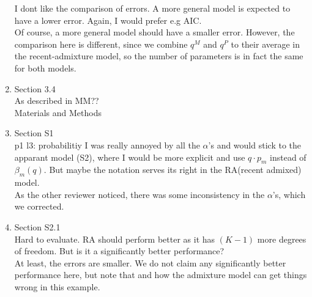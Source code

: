 \documentclass[12pt]{article}
\theoremstyle{definition}
\begin{document}
\begin{enumerate}
  I dont like the comparison of errors. A more general model is expected to have a lower error. Again, I would prefer e.g AIC.
  \\
  {\color{blue} Of course, a more general model should have a smaller error. However, the comparison here is different, since we combine $q^M$ and $q^P$ to their average in the recent-admixture model, so the number of parameters is in fact the same for both models. }
\item   
  Section 3.4\\
  As described in MM??
  \\ {\color{blue} Materials and Methods}
\item Section S1\\
  p1 l3: probabilitiy I was really annoyed by all the $\alpha$’s and would stick to the apparant model (S2), where I would be more
  explicit and use $q\cdot p_m$ instead of $\beta_m(q)$. But maybe the
  notation serves its right in the RA(recent admixed) model.
  \\ {\color{blue}As the other reviewer noticed, there was some inconsistency in the $\alpha$'s, which we corrected. }
  \item 
  Section S2.1\\
  Hard to evaluate. RA should perform better as it has $(K-1)$ more degrees of freedom. But is it a significantly better performance?
  \\ {\color{blue} At least, the errors are smaller. We do not claim any significantly better performance here, but note that and how the admixture model can get things wrong in this example.}
\end{enumerate}
\end{document}
